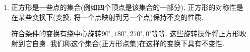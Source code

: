 \begin{enumerate}
	\item 正方形是一些点的集合(例如四个顶点是该集合的一部分), 正方形的对称性是在某些变换下(变换: 将一个点映射到另一个点)保持不变的性质.
		
	符合条件的变换有绕中心旋转$90^\circ, 180^\circ, 270^\circ, 0^\circ$等等. 这些旋转操作将正方形映射到它自身. 我们称这个集合(正方形点集)在这样的变换下具有不变性.
	
	
	

\end{enumerate}
